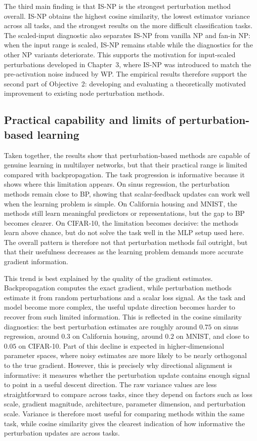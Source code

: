 The third main finding is that IS-NP is the strongest perturbation method overall. IS-NP obtains the highest cosine similarity, the lowest estimator variance across all tasks, and the strongest results on the more difficult classification tasks. The scaled-input diagnostic also separates IS-NP from vanilla NP and fan-in NP: when the input range is scaled, IS-NP remains stable while the diagnostics for the other NP variants deteriorate. This supports the motivation for input-scaled perturbations developed in Chapter~3, where IS-NP was introduced to match the pre-activation noise induced by WP. The empirical results therefore support the second part of Objective~2: developing and evaluating a theoretically motivated improvement to existing node perturbation methods.

\subsection{Practical capability and limits of perturbation-based learning}

Taken together, the results show that perturbation-based methods are capable of genuine learning in multilayer networks, but that their practical range is limited compared with backpropagation. The task progression is informative because it shows where this limitation appears. On sinus regression, the perturbation methods remain close to BP, showing that scalar-feedback updates can work well when the learning problem is simple. On California housing and MNIST, the methods still learn meaningful predictors or representations, but the gap to BP becomes clearer. On CIFAR-10, the limitation becomes decisive: the methods learn above chance, but do not solve the task well in the MLP setup used here. The overall pattern is therefore not that perturbation methods fail outright, but that their usefulness decreases as the learning problem demands more accurate gradient information.

This trend is best explained by the quality of the gradient estimates. Backpropagation computes the exact gradient, while perturbation methods estimate it from random perturbations and a scalar loss signal. As the task and model become more complex, the useful update direction becomes harder to recover from such limited information. This is reflected in the cosine similarity diagnostics: the best perturbation estimates are roughly around \(0.75\) on sinus regression, around \(0.3\) on California housing, around \(0.2\) on MNIST, and close to \(0.05\) on CIFAR-10. Part of this decline is expected in higher-dimensional parameter spaces, where noisy estimates are more likely to be nearly orthogonal to the true gradient. However, this is precisely why directional alignment is informative: it measures whether the perturbation update contains enough signal to point in a useful descent direction. The raw variance values are less straightforward to compare across tasks, since they depend on factors such as loss scale, gradient magnitude, architecture, parameter dimension, and perturbation scale. Variance is therefore most useful for comparing methods within the same task, while cosine similarity gives the clearest indication of how informative the perturbation updates are across tasks.

